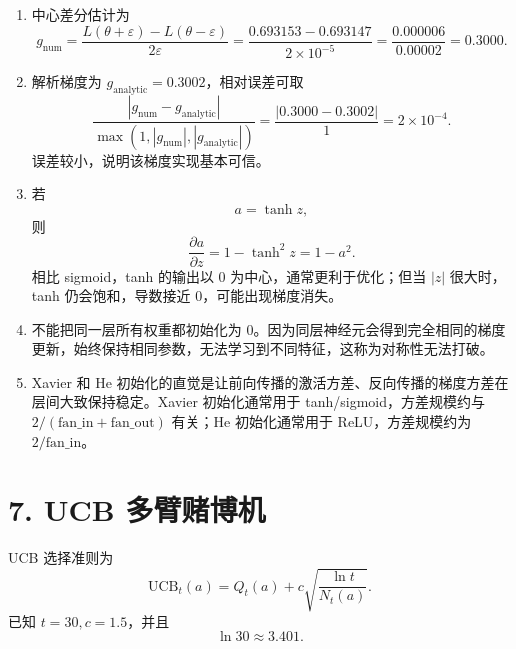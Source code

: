 \documentclass[UTF8,zihao=-4]{ctexart}
\begin{document}
\begin{enumerate}[label=(\arabic*)]
\item 中心差分估计为
\[
g_{\mathrm{num}}
=\frac{L(\theta+\varepsilon)-L(\theta-\varepsilon)}{2\varepsilon}
=\frac{0.693153-0.693147}{2\times 10^{-5}}
=\frac{0.000006}{0.00002}
=0.3000.
\]

\item 解析梯度为 $g_{\mathrm{analytic}}=0.3002$，相对误差可取
\[
\frac{|g_{\mathrm{num}}-g_{\mathrm{analytic}}|}
{\max(1,|g_{\mathrm{num}}|,|g_{\mathrm{analytic}}|)}
=\frac{|0.3000-0.3002|}{1}=2\times 10^{-4}.
\]
误差较小，说明该梯度实现基本可信。

\item 若
\[
a=\tanh z,
\]
则
\[
\frac{\partial a}{\partial z}=1-\tanh^2 z=1-a^2.
\]
相比 sigmoid，tanh 的输出以 $0$ 为中心，通常更利于优化；但当 $|z|$ 很大时，tanh 仍会饱和，导数接近 $0$，可能出现梯度消失。

\item 不能把同一层所有权重都初始化为 $0$。因为同层神经元会得到完全相同的梯度更新，始终保持相同参数，无法学习到不同特征，这称为对称性无法打破。

\item Xavier 和 He 初始化的直觉是让前向传播的激活方差、反向传播的梯度方差在层间大致保持稳定。Xavier 初始化通常用于 tanh/sigmoid，方差规模约与 $2/(\mathrm{fan\_in}+\mathrm{fan\_out})$ 有关；He 初始化通常用于 ReLU，方差规模约为 $2/\mathrm{fan\_in}$。
\end{enumerate}

\section*{7. UCB 多臂赌博机}

UCB 选择准则为
\[
\mathrm{UCB}_t(a)=Q_t(a)+c\sqrt{\frac{\ln t}{N_t(a)}}.
\]
已知 $t=30,c=1.5$，并且
\[
\ln 30\approx 3.401.
\]
\end{document}
